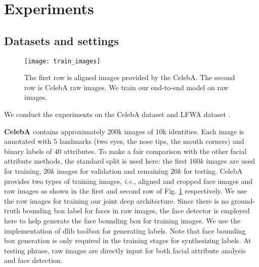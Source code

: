 \documentclass[10pt,twocolumn,letterpaper]{article}
\begin{document}
\section{Experiments}

\label{Experiments}

\subsection{Datasets and settings}

\begin{figure}[t]
\begin{centering}
\texttt{[image: train\_images]} %
\par\end{centering}
\caption{\label{fig:train-images} The first row is aligned images provided by the CelebA. 
The second row is CelebA raw images. We train our end-to-end
model on raw images.}
\end{figure}

\noindent We conduct the experiments on the CelebA dataset \cite{liu2015deep}
and LFWA dataset \cite{huang2007labeled,liu2015deep}.

\noindent \textbf{CelebA \cite{liu2015deep}} contains approximately
200k images of 10k identities. Each image is annotated with $5$ landmarks
(two eyes, the nose tips, the mouth corners) and binary labels of
$40$ attributes. To make a fair comparison with the other facial
attribute methods, the standard split is used here: the first $160k$
images are used for training, $20k$ images for validation and remaining
$20k$ for testing. CelebA provides two types of training images,
\emph{i.e.}, aligned and cropped face images and raw images as shown
in the first and second row of Fig. \ref{fig:train-images} respectively.
We use the raw images for training our joint deep architecture. Since
there is no ground-truth bounding box label for faces in raw images,
the face detector \cite{dalal2005histograms,dlib09} is employed here
to help generate the face bounding box for training images. We use
the implementation of dlib toolbox \cite{dlib09,dalal2005histograms}
for generating labels. Note that face bounding box generation is only required in the training stages 
for synthesizing labels.
At testing phrase, raw images are directly
input for both facial attribute analysis and face detection.

\vspace{0.05in}
\end{document}
